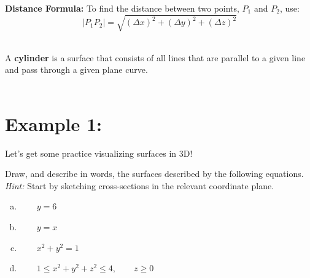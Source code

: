  \textbf{Distance Formula:} To find the distance between two points, \(P_1\) and \(P_2\), use:\\
\[
|P_1 P_2| = \sqrt{(\Delta x)^2 + (\Delta y)^2 +(\Delta z)^2}
\]

~\\
A \textbf{cylinder} is a surface that consists of all lines that are parallel to a given line and pass through a given plane curve.\\~\\





%
\section*{Example 1:}
Let's get some practice visualizing surfaces in 3D!

Draw, and describe in words,  the surfaces described by the following equations.\\
\textit{Hint:}  Start by sketching cross-sections in the relevant coordinate plane.\\

\begin{enumerate}[(a)]


\item \(\qquad y=6\)
\vspace*{1.5in}

\item \(\qquad y = x\)
\vspace*{1.5in}

\item \(\qquad x^2 + y^2 = 1\)
\vspace*{1.5in}

\item \(\qquad 1 \leq x^2 + y^2 + z^2 \leq 4, \qquad z \geq 0\)
\vspace*{1.5in}




\end{enumerate}


